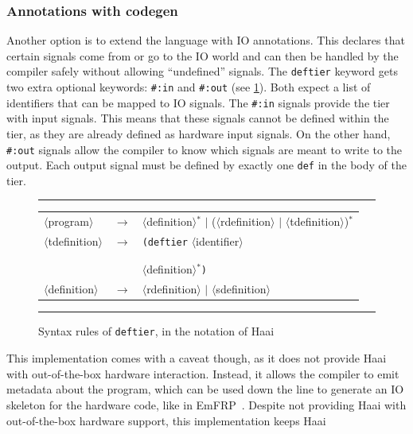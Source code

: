\documentclass[a4paper]{book}
\begin{document}
\subsubsection{Annotations with codegen}
Another option is to extend the language with IO annotations. This declares that
certain signals come from or go to the IO world and can then be handled by the
compiler safely without allowing \enquote{undefined} signals. The
\texttt{deftier} keyword gets two extra optional keywords: \texttt{\#:in} and
\texttt{\#:out} (see \cref{fig:deftier-syntax}). Both expect a list of
identifiers that can be mapped to IO signals. The \texttt{\#:in} signals provide
the tier with input signals. This means that these signals cannot be defined
within the tier, as they are already defined as hardware input signals. On the other hand,
\texttt{\#:out} signals allow the compiler to know which signals are meant to
write to the output. Each output signal must be defined by exactly one
\texttt{def} in the body of the tier.
\begin{figure}[ht]
	\newcommand{\nt}[1]{$\langle$#1$\rangle$}
	\hrule
	\medskip
    \centering
	\begin{tabular}{@{}l@{ }c@{ }l@{}}
		\nt{program} & $\longrightarrow$ & \nt{definition}$^{*}$ $\mid$ (\nt{rdefinition} $\mid$ \nt{tdefinition})$^{*}$\\
		\nt{tdefinition} & $\longrightarrow$ & \texttt{(deftier} \nt{identifier}\\
		& & \quad [ \texttt{\#:in} \texttt{(}\nt{identifier}$^{*}$\texttt{)} ]\\
		& & \quad [ \texttt{\#:out} \texttt{(}\nt{identifier}$^{*}$\texttt{)} ]\\
		& & \quad \nt{definition}$^{*}$\texttt{)}\\
    \nt{definition} & $\longrightarrow$ & \nt{rdefinition} $\mid$ \nt{sdefinition}
	\end{tabular}
	\par\medskip
	\hrule
	\smallskip
	\caption{Syntax rules of \texttt{deftier}, in the notation of
	Haai~\cite{oeyen2024reactive}}
	\label{fig:deftier-syntax}
\end{figure}
\par
This implementation comes with a caveat though, as it does
not provide Haai with out-of-the-box hardware interaction. Instead, it allows
the compiler to emit metadata about the program, which can be used down the line to
generate an IO skeleton for the hardware code, like in EmFRP~\cite{sawada2016emfrp}. Despite not providing Haai with
out-of-the-box hardware support, this implementation keeps Haai
\end{document}
